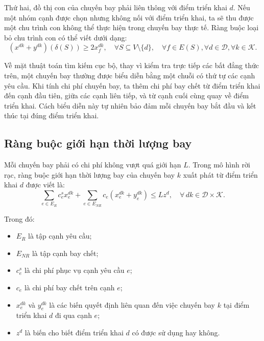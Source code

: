 Thứ hai, đồ thị con của chuyến bay phải liên thông với điểm triển khai $d$. Nếu một nhóm cạnh được chọn nhưng không nối với điểm triển khai, ta sẽ thu được một chu trình con không thể thực hiện trong chuyến bay thực tế. Ràng buộc loại bỏ chu trình con có thể viết dưới dạng:
\begin{equation}
(x^{dk} + y^{dk})(\delta(S)) \geq 2x^{dk}_f,
\quad
\forall S \subseteq V \setminus \{d\},\quad
\forall f \in E(S),
\forall d \in \mathcal{D},
\forall k \in \mathcal{K}.
\end{equation}

Về mặt thuật toán tìm kiếm cục bộ, thay vì kiểm tra trực tiếp các bất đẳng thức trên, một chuyến bay thường được biểu diễn bằng một chuỗi có thứ tự các cạnh yêu cầu. Khi tính chi phí chuyến bay, ta thêm chi phí bay chết từ điểm triển khai đến cạnh đầu tiên, giữa các cạnh liên tiếp, và từ cạnh cuối cùng quay về điểm triển khai. Cách biểu diễn này tự nhiên bảo đảm mỗi chuyến bay bắt đầu và kết thúc tại đúng điểm triển khai.

\subsection{Ràng buộc giới hạn thời lượng bay}

Mỗi chuyến bay phải có chi phí không vượt quá giới hạn \(L\). Trong mô hình rời rạc, ràng buộc giới hạn thời lượng bay của chuyến bay \(k\) xuất phát từ điểm triển khai \(d\) được viết là:
\begin{equation}
\sum_{e \in E_R} c^s_e x^{dk}_e
+
\sum_{e \in E_{NR}} c_e \left(x^{dk}_e + y^{dk}_e\right)
\leq L z^d,
\quad \forall\, dk \in \mathcal{D} \times \mathcal{K}.
\end{equation}

Trong đó:
\begin{itemize}
    \item \(E_R\) là tập cạnh yêu cầu;
    \item \(E_{NR}\) là tập cạnh bay chết;
    \item \(c^s_e\) là chi phí phục vụ cạnh yêu cầu \(e\);
    \item \(c_e\) là chi phí bay chết trên cạnh \(e\);
    \item \(x^{dk}_e\) và \(y^{dk}_e\) là các biến quyết định liên quan đến việc chuyến bay \(k\) tại điểm triển khai \(d\) đi qua cạnh \(e\);
    \item \(z^d\) là biến cho biết điểm triển khai \(d\) có được sử dụng hay không.
\end{itemize}

